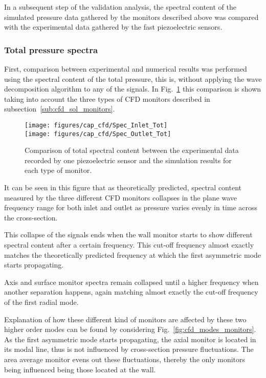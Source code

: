 In a subsequent step of the validation analysis, the spectral content of the simulated pressure data gathered by the monitors described above was compared with the experimental data gathered by the fast piezoelectric sensors.

\subsubsection{Total pressure spectra}

First, comparison between experimental and numerical results was performed using the spectral content of the total pressure, this is, without applying the wave decomposition algorithm to any of the signals. In Fig.~\ref{fig:cfd_Spec_Inlet_Tot} this comparison is shown taking into account the three types of CFD monitors described in subsection~\ref{sub:cfd_sol_monitors}.

\begin{figure}[htb!]
\centering
\texttt{[image: figures/cap\_cfd/Spec\_Inlet\_Tot]}\\[5mm]
\texttt{[image: figures/cap\_cfd/Spec\_Outlet\_Tot]}
\caption{Comparison of total spectral content between the experimental data recorded by one piezoelectric sensor and the simulation results for each type of monitor.}
\label{fig:cfd_Spec_Inlet_Tot}
\end{figure}

It can be seen in this figure that as theoretically predicted,  spectral content measured by the three different CFD monitors collapses in the plane wave frequency range for both inlet and outlet as pressure varies evenly in time across the cross-section.

This collapse of the signals ends when the wall monitor starts to show different spectral content after a certain frequency. This cut-off frequency almost exactly matches the theoretically predicted frequency at which the first asymmetric mode starts propagating.

Axis and surface monitor spectra remain collapsed until a higher frequency when another separation happens, again matching almost exactly the cut-off frequency of the first radial mode.

Explanation of how these different kind of monitors are affected by these two higher order modes can be found by considering Fig.~\ref{fig:cfd_modes_monitors}. As the first asymmetric mode starts propagating, the axial monitor is located in its modal line, thus is not influenced by cross-section pressure fluctuations. The area average monitor evens out these fluctuations, thereby the only monitors being influenced being those located at the wall.

